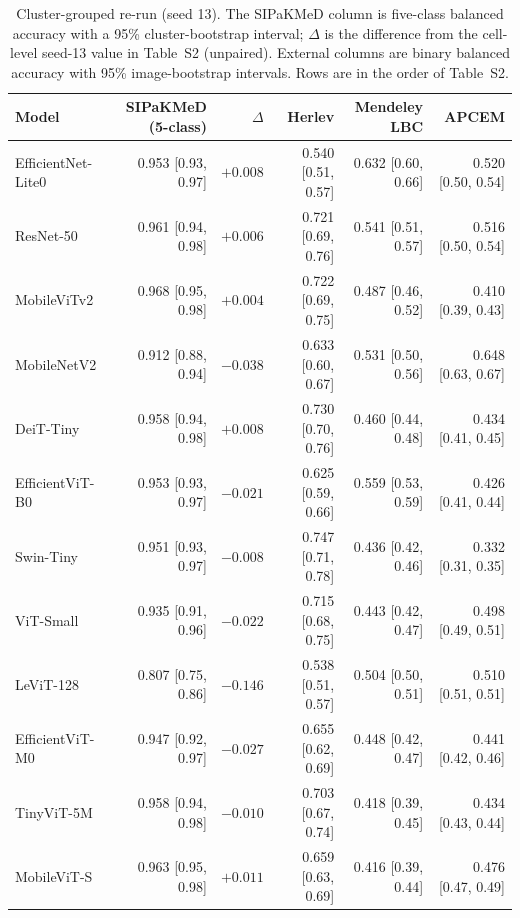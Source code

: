 \documentclass[12pt,letterpaper]{article}
\begin{document}
\begin{table}[htbp]
\centering
\caption{Cluster-grouped re-run (seed 13). The SIPaKMeD column is five-class balanced accuracy with a 95\% cluster-bootstrap interval; $\Delta$ is the difference from the cell-level seed-13 value in Table~S2 (unpaired). External columns are binary balanced accuracy with 95\% image-bootstrap intervals. Rows are in the order of Table~S2.}
\label{tab:cluster}
\scriptsize
\begin{tabular}{@{}lrrrrr@{}}
\toprule
Model & SIPaKMeD (5-class) & $\Delta$ & Herlev & Mendeley LBC & APCEM \\
\midrule
EfficientNet-Lite0 & 0.953 [0.93, 0.97] & $+0.008$ & 0.540 [0.51, 0.57] & 0.632 [0.60, 0.66] & 0.520 [0.50, 0.54] \\
ResNet-50 & 0.961 [0.94, 0.98] & $+0.006$ & 0.721 [0.69, 0.76] & 0.541 [0.51, 0.57] & 0.516 [0.50, 0.54] \\
MobileViTv2 & 0.968 [0.95, 0.98] & $+0.004$ & 0.722 [0.69, 0.75] & 0.487 [0.46, 0.52] & 0.410 [0.39, 0.43] \\
MobileNetV2 & 0.912 [0.88, 0.94] & $-0.038$ & 0.633 [0.60, 0.67] & 0.531 [0.50, 0.56] & 0.648 [0.63, 0.67] \\
DeiT-Tiny & 0.958 [0.94, 0.98] & $+0.008$ & 0.730 [0.70, 0.76] & 0.460 [0.44, 0.48] & 0.434 [0.41, 0.45] \\
EfficientViT-B0 & 0.953 [0.93, 0.97] & $-0.021$ & 0.625 [0.59, 0.66] & 0.559 [0.53, 0.59] & 0.426 [0.41, 0.44] \\
Swin-Tiny & 0.951 [0.93, 0.97] & $-0.008$ & 0.747 [0.71, 0.78] & 0.436 [0.42, 0.46] & 0.332 [0.31, 0.35] \\
ViT-Small & 0.935 [0.91, 0.96] & $-0.022$ & 0.715 [0.68, 0.75] & 0.443 [0.42, 0.47] & 0.498 [0.49, 0.51] \\
LeViT-128 & 0.807 [0.75, 0.86] & $-0.146$ & 0.538 [0.51, 0.57] & 0.504 [0.50, 0.51] & 0.510 [0.51, 0.51] \\
EfficientViT-M0 & 0.947 [0.92, 0.97] & $-0.027$ & 0.655 [0.62, 0.69] & 0.448 [0.42, 0.47] & 0.441 [0.42, 0.46] \\
TinyViT-5M & 0.958 [0.94, 0.98] & $-0.010$ & 0.703 [0.67, 0.74] & 0.418 [0.39, 0.45] & 0.434 [0.43, 0.44] \\
MobileViT-S & 0.963 [0.95, 0.98] & $+0.011$ & 0.659 [0.63, 0.69] & 0.416 [0.39, 0.44] & 0.476 [0.47, 0.49] \\
\bottomrule
\end{tabular}
\end{table}
\end{document}
